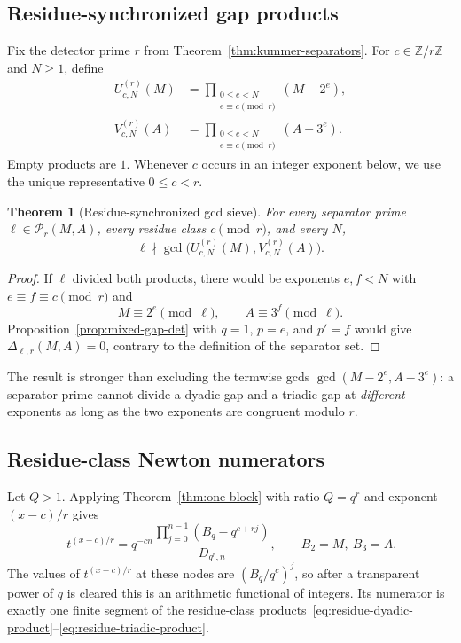 \documentclass[11pt,oneside]{article}
\newtheorem{theorem}{Theorem}[section]
\theoremstyle{definition}
\theoremstyle{remark}
\newcommand{\Z}{\mathbb Z}
\begin{document}
\subsection{Residue-synchronized gap products}

Fix the detector prime $r$ from Theorem~\ref{thm:kummer-separators}.  For
$c\in\Z/r\Z$ and $N\ge1$, define
\begin{align}
 U_{c,N}^{(r)}(M)
 &=\prod_{\substack{0\le e<N\\e\equiv c\pmod r}}(M-2^e),
 \label{eq:residue-dyadic-product}\\
 V_{c,N}^{(r)}(A)
 &=\prod_{\substack{0\le e<N\\e\equiv c\pmod r}}(A-3^e).
 \label{eq:residue-triadic-product}
\end{align}
Empty products are $1$.  Whenever $c$ occurs in an integer exponent below, we use the unique
representative $0\le c<r$.

\begin{theorem}[Residue-synchronized gcd sieve]
\label{thm:residue-gcd-sieve}
For every separator prime $\ell\in\mathcal P_r(M,A)$, every residue class $c\pmod r$, and
every $N$,
\begin{equation}
 \ell\nmid
 \gcd\bigl(U_{c,N}^{(r)}(M),V_{c,N}^{(r)}(A)\bigr).
 \label{eq:residue-gcd-exclusion}
\end{equation}
\end{theorem}

\begin{proof}
If $\ell$ divided both products, there would be exponents $e,f<N$ with
$e\equiv f\equiv c\pmod r$ and
\[
 M\equiv2^e\pmod\ell,
 \qquad
 A\equiv3^f\pmod\ell.
\]
Proposition~\ref{prop:mixed-gap-det} with $q=1$, $p=e$, and $p'=f$ would give
$\Delta_{\ell,r}(M,A)=0$, contrary to the definition of the separator set.
\end{proof}

The result is stronger than excluding the termwise gcds
$\gcd(M-2^e,A-3^e)$: a separator prime cannot divide a dyadic gap and a triadic gap at
\emph{different} exponents as long as the two exponents are congruent modulo $r$.

\subsection{Residue-class Newton numerators}

Let $Q>1$.  Applying Theorem~\ref{thm:one-block} with ratio $Q=q^r$ and exponent
$(x-c)/r$ gives
\begin{equation}
 [1,q^r,q^{2r},\ldots,q^{rn}]\,t^{(x-c)/r}
 =q^{-cn}
 \frac{\prod_{j=0}^{n-1}(B_q-q^{c+rj})}{D_{q^r,n}},
 \qquad B_2=M,\ B_3=A.
 \label{eq:residue-newton-factor}
\end{equation}
The values of $t^{(x-c)/r}$ at these nodes are
$(B_q/q^c)^j$, so after a transparent power of $q$ is cleared this is an arithmetic
functional of integers.  Its numerator is exactly one finite segment of the residue-class
products~\eqref{eq:residue-dyadic-product}--\eqref{eq:residue-triadic-product}.
\end{document}
